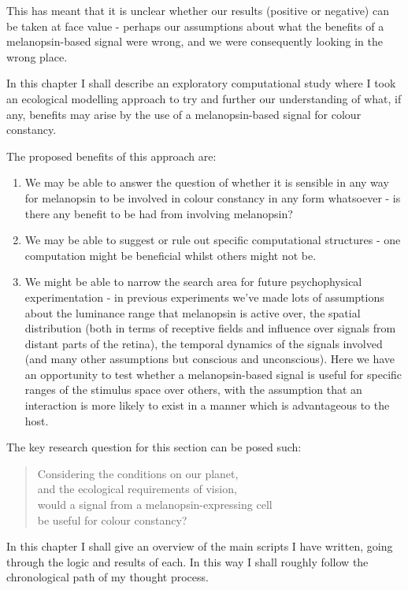 This has meant that it is unclear whether our results (positive or negative) can be taken at face value - perhaps our assumptions about what the benefits of a melanopsin-based signal were wrong, and we were consequently looking in the wrong place.

In this chapter I shall describe an exploratory computational study where I took an ecological modelling approach to try and further our understanding of what, if any, benefits may arise by the use of a melanopsin-based signal for colour constancy.

\noindent The proposed benefits of this approach are: 
\begin{enumerate}
    \item We may be able to answer the question of whether it is sensible in any way for melanopsin to be involved in colour constancy in any form whatsoever - is there any benefit to be had from involving melanopsin?
    \item We may be able to suggest or rule out specific computational structures - one computation might be beneficial whilst others might not be.
    \item We might be able to narrow the search area for future psychophysical experimentation - in previous experiments we've made lots of assumptions about the luminance range that melanopsin is active over, the spatial distribution (both in terms of receptive fields and influence over signals from distant parts of the retina), the temporal dynamics of the signals involved (and many other assumptions but conscious and unconscious). Here we have an opportunity to test whether a melanopsin-based signal is useful for specific ranges of the stimulus space over others, with the assumption that an interaction is more likely to exist in a manner which is advantageous to the host.
\end{enumerate}

\noindent The key research question for this section can be posed such:

\begin{quote}
Considering the conditions on our planet, \\
and the ecological requirements of vision, \\
would a signal from a melanopsin-expressing cell \\
be useful for colour constancy?
\end{quote}

In this chapter I shall give an overview of the main scripts I have written, going through the logic and results of each. In this way I shall roughly follow the chronological path of my thought process.

